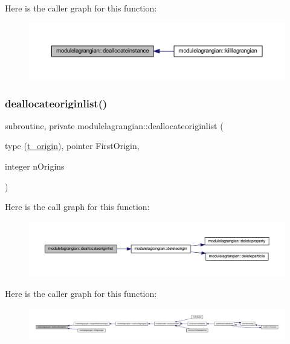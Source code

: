 Here is the caller graph for this function\+:\nopagebreak
\begin{figure}[H]
\begin{center}
\leavevmode
\includegraphics[width=350pt]{namespacemodulelagrangian_a43ea933b1bd63328af5b5fde1d41787a_icgraph}
\end{center}
\end{figure}
\mbox{\label{namespacemodulelagrangian_a3f11dfb687cee81738d6fd8944750d72}} 
\subsubsection{\texorpdfstring{deallocateoriginlist()}{deallocateoriginlist()}}
{\footnotesize\ttfamily subroutine, private modulelagrangian\+::deallocateoriginlist (\begin{DoxyParamCaption}\item[{type (\mbox{\hyperlink{structmodulelagrangian_1_1t__origin}{t\+\_\+origin}}), pointer}]{First\+Origin,  }\item[{integer}]{n\+Origins }\end{DoxyParamCaption})\hspace{0.3cm}{\ttfamily [private]}}

Here is the call graph for this function\+:\nopagebreak
\begin{figure}[H]
\begin{center}
\leavevmode
\includegraphics[width=350pt]{namespacemodulelagrangian_a3f11dfb687cee81738d6fd8944750d72_cgraph}
\end{center}
\end{figure}
Here is the caller graph for this function\+:\nopagebreak
\begin{figure}[H]
\begin{center}
\leavevmode
\includegraphics[width=350pt]{namespacemodulelagrangian_a3f11dfb687cee81738d6fd8944750d72_icgraph}
\end{center}
\end{figure}
\mbox{\label{namespacemodulelagrangian_a29d4dbfc02fe16a5c49ac6fac8d3e427}} 
